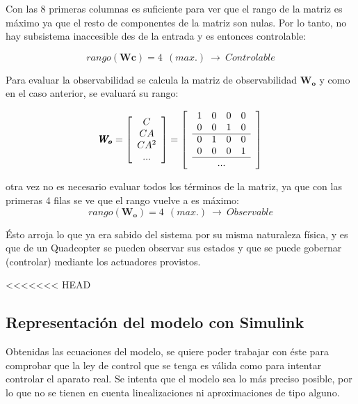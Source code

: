 \documentclass[twoside]{article}
\begin{document}
Con las 8 primeras columnas es suficiente para ver que el rango de la matriz es máximo ya que el resto de componentes de la matriz son nulas. Por lo tanto, no hay subsistema inaccesible des de la entrada y es entonces controlable:

\begin{equation}
rango(\pmb{Wc})=4\>\>(max.)\> \rightarrow \>Controlable
\end{equation}

Para evaluar la observabilidad se calcula la matriz de observabilidad $\pmb{W_o}$ y como en el caso anterior, se evaluará su rango:

\begin{equation}
\pmb{W_o}=\left[ \begin{array}{c}
C \\
CA \\
CA^2 \\
...
\end{array}\right] =\left[\begin{array}{c}

\begin{array}{cccc}
1 & 0 & 0 & 0 \\
0 & 0 & 1 & 0 \\
\hline 
0 & 1 & 0 & 0 \\
0 & 0 & 0 & 1 \\
\hline
\end{array}\\
...\\ \end{array} \right]
\end{equation}

otra vez no es necesario evaluar todos los términos de la matriz, ya que con las primeras 4 filas se ve que el rango vuelve a es máximo:
\begin{equation}
rango(\pmb{W_o})=4\>\>(max.) \> \rightarrow \> Observable
\end{equation}

Ésto arroja lo que ya era sabido del sistema por su misma naturaleza física, y es que de un Quadcopter se pueden observar sus estados y que se puede gobernar (controlar) mediante los actuadores provistos. 

\newpage
<<<<<<< HEAD
\subsection{Representación del modelo con Simulink}

Obtenidas las ecuaciones del modelo, se quiere poder trabajar con éste para comprobar que la ley de control que se tenga es válida como para intentar controlar el aparato real. Se intenta que el modelo sea lo más preciso posible, por lo que no se tienen en cuenta linealizaciones ni aproximaciones de tipo alguno. 
\end{document}
